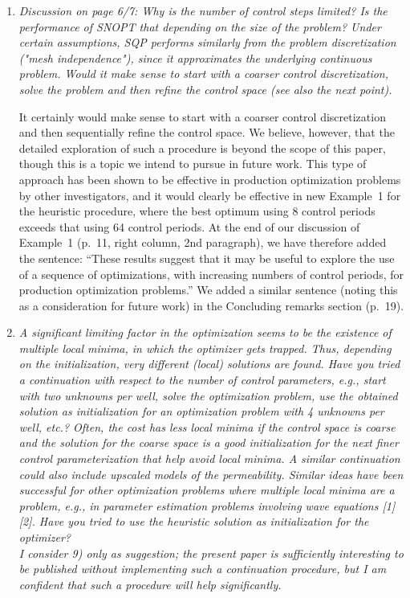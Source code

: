\documentclass{article}
\begin{document}
\begin{enumerate}
   \item {\it Discussion on page 6/7: Why is the number of control steps limited?
   Is the performance of SNOPT that depending on the size of the
   problem? Under certain assumptions, SQP performs similarly from the
   problem discretization ("mesh independence"), since it approximates
   the underlying continuous problem. Would it make sense to start with
   a coarser control discretization, solve the problem and then refine
   the control space (see also the next point).}
   
It certainly would make sense to start with a coarser control discretization and then sequentially refine the control space. We believe, however, that the detailed exploration of such a procedure is beyond the scope of this paper, though this is a topic we intend to pursue in future work. This type of approach has been shown to be effective in production optimization problems by other investigators, and it would clearly be effective in new Example~1 for the heuristic procedure, where the best optimum using 8 control periods exceeds that using 64 control periods. At the end of our discussion of Example~1 (p.~11, right column, 2nd paragraph), we have therefore added the sentence: ``These results suggest that it may be useful to explore the use of a sequence of optimizations, with increasing numbers of control periods, for production optimization problems.'' We added a similar sentence (noting this as a consideration for future work) in the Concluding remarks section (p.~19).


   \item {\it A significant limiting factor in the optimization seems to be the
   existence of multiple local minima, in which the optimizer gets
trapped. Thus, depending on the initialization, very different (local)
  solutions are found. Have you tried a continuation with respect to the
  number of control parameters, e.g., start with two unknowns per well,
  solve the optimization problem, use the obtained solution as
  initialization for an optimization problem with 4 unknowns per well,
  etc.? Often, the cost has less local minima if the control space is
  coarse and the solution for the coarse space is a good initialization
  for the next finer control parameterization that help avoid local
  minima.  A similar continuation could also include upscaled models of
  the permeability.  Similar ideas have been successful for other
  optimization problems where multiple local minima are a problem,
  e.g., in parameter estimation problems involving wave equations [1]
  [2].  Have you tried to use the heuristic solution as initialization
  for the optimizer?
  \\
    I consider 9) only as suggestion; the present paper is sufficiently
  interesting to be published without implementing such a continuation
  procedure, but I am confident that such a procedure will help
  significantly.
  }


\end{enumerate}
\end{document}
